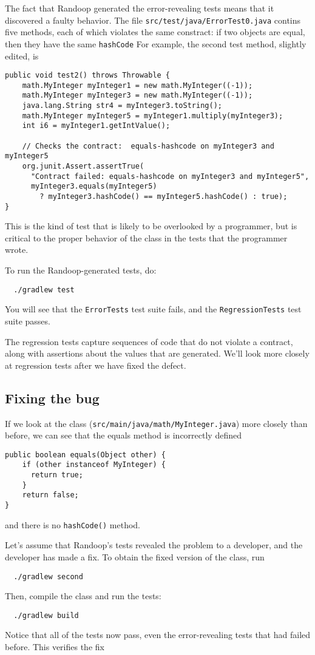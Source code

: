 \documentclass[11pt, oneside]{article} %
\newcommand{\code}[1]{{\texttt{#1}}}
\begin{document}
The fact that Randoop generated the error-revealing tests means that it
discovered a faulty behavior.
The file \texttt{src/test/java/ErrorTest0.java} contins five methods, each
of which violates the same constract:
if two objects are equal, then they have the same \code{hashCode}
For example, the second test method, slightly edited, is
\begin{verbatim}
public void test2() throws Throwable {
    math.MyInteger myInteger1 = new math.MyInteger((-1));
    math.MyInteger myInteger3 = new math.MyInteger((-1));
    java.lang.String str4 = myInteger3.toString();
    math.MyInteger myInteger5 = myInteger1.multiply(myInteger3);
    int i6 = myInteger1.getIntValue();
    
    // Checks the contract:  equals-hashcode on myInteger3 and myInteger5
    org.junit.Assert.assertTrue(
      "Contract failed: equals-hashcode on myInteger3 and myInteger5",
      myInteger3.equals(myInteger5) 
        ? myInteger3.hashCode() == myInteger5.hashCode() : true);
}
\end{verbatim}
This is the kind of test that is likely to be overlooked by a programmer, but is critical to the proper behavior of the class in the tests that the programmer wrote.

To run the Randoop-generated tests, do:
\begin{verbatim}
  ./gradlew test
\end{verbatim}
You will see that the \texttt{ErrorTests} test suite fails, and the
\texttt{RegressionTests} test suite passes.

The regression tests capture sequences of code that do not violate a contract, along with assertions about the values that are generated. 
We'll look more closely at regression tests after we have fixed the defect.

\subsection{Fixing the bug}

If we look at the class (\texttt{src/main/java/math/MyInteger.java}) more closely than before, we can see that the equals method is incorrectly defined
\begin{verbatim}
public boolean equals(Object other) {
    if (other instanceof MyInteger) {
      return true;
    }
    return false;
}
\end{verbatim}
and there is no \code{hashCode()} method.

Let's assume that Randoop's tests revealed the problem to a developer, and
the developer has made a fix.  To obtain the fixed version of the class, run
\begin{verbatim}
  ./gradlew second
\end{verbatim}
Then, compile the class and run the tests:
\begin{verbatim}
  ./gradlew build
\end{verbatim}
Notice that all of the tests now pass, even the error-revealing tests that had failed before.
This verifies the fix
\end{document}
